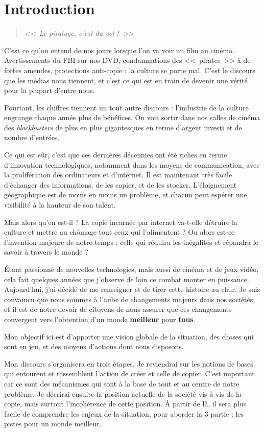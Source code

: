 \chapter*{Introduction}

\begin{quote}
{\Large \textit{<<~Le piratage, c'est du vol !~>>}}
\end{quote}

C'est ce qu'on entend de nos jours lorsque l'on va voir un film au cinéma. Avertissements du FBI sur nos DVD, condamnations des <<~pirates~>> à de fortes amendes, protections anti-copie : la culture se porte mal. C'est le discours que les médias nous tiennent, et c'est ce qui est en train de devenir une vérité pour la plupart d'entre nous.

Pourtant, les chiffres tiennent un tout autre discours : l'industrie de la culture engrange chaque année plus de bénéfices. On voit sortir dans nos salles de cinéma des \textit{blockbusters} de plus en plus gigantesques en terme d'argent investi et de nombre d'entrées.

Ce qui est sûr, c'est que ces dernières décennies ont été riches en terme d'innovation technologiques, notamment dans les moyens de communication, avec la prolifération des ordinateurs et d'internet. Il est maintenant très facile d'échanger des informations, de les copier, et de les stocker. L'éloignement géographique est de moins en moins un problème, et chacun peut espérer une visibilité à la hauteur de son talent.

Mais alors qu'en est-il ? La copie incarnée par internet va-t-elle détruire la culture et mettre au chômage tout ceux qui l'alimentent ? Ou alors est-ce l'invention majeure de notre temps : celle qui réduira les inégalités et répandra le savoir à travers le monde ?

Étant passionné de nouvelles technologies, mais aussi de cinéma et de jeux vidéo, cela fait quelques années que j'observe de loin ce combat monter en puissance. Aujourd'hui, j'ai décidé de me renseigner et de tirer cette histoire au clair. Je suis convaincu que nous sommes à l'aube de changements majeurs dans nos sociétés, et il est de notre devoir de citoyens de nous assurer que ces changements convergent vers l'obtention d'un monde \textbf{meilleur} pour \textbf{tous}.

Mon objectif ici est d'apporter une vision globale de la situation, des choses qui sont en jeu, et des moyens d'actions dont nous disposons.

Mon discours s'organisera en trois étapes. Je reviendrai sur les notions de bases qui entourent et rassemblent l'action de créer et celle de copier. C'est important car ce sont des mécanismes qui sont à la base de tout et au centre de notre problème. Je décrirai ensuite la position actuelle de la société vis à vis de la copie, mais surtout l'incohérence de cette position. À partir de là, il sera plus facile de comprendre les enjeux de la situation, pour aborder la 3\ieme{} partie : les pistes pour un monde meilleur.
